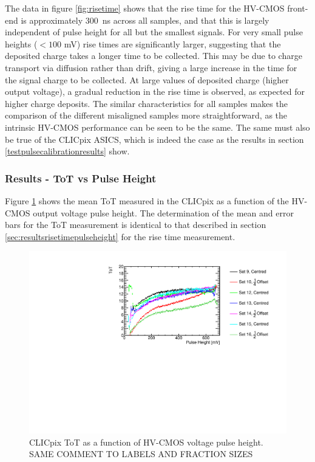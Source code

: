 The data in figure \ref{fig:risetime} shows that the rise time for the HV-CMOS front-end is approximately 300~ns across all samples, and that this is largely independent of pulse height for all but the smallest signals. For very small pulse heights ($< 100$ mV) rise times are significantly larger, suggesting that the deposited charge takes a longer time to be collected. This may be due to charge transport via diffusion rather than drift, giving a large increase in the time for the signal charge to be collected. At large values of deposited charge (higher output voltage), a gradual reduction in the rise time is observed, as expected for higher charge deposits. The similar characteristics for all samples makes the comparison of the different misaligned samples more straightforward, as the intrinsic HV-CMOS performance can be seen to be the same. The same must also be true of the CLICpix ASICS, which is indeed the case as the results in section \ref{testpulsecalibrationresults} show.  


\subsubsection{Results -  ToT vs Pulse Height}
\label{sec:totvspulseheight}

Figure \ref{fig:tot} shows the mean ToT measured in the CLICpix as a function of the HV-CMOS output voltage pulse height.  The determination of the mean and error bars for the ToT measurement is identical to that described in section \ref{sec:resultsrisetimepulseheight} for the rise time measurement. 

\begin{figure}
\centering
\includegraphics[width=1.0\textwidth]{CLICdpVertex/Plots/RadSourceAnalysis/AllSETs_TargetTot_PulseHeight.pdf}
\caption[CLICpix ToT as a function of HV-CMOS voltage pulse height.]{CLICpix ToT as a function of HV-CMOS voltage pulse height.  SAME COMMENT TO LABELS AND FRACTION SIZES}
\label{fig:tot}
\end{figure}

